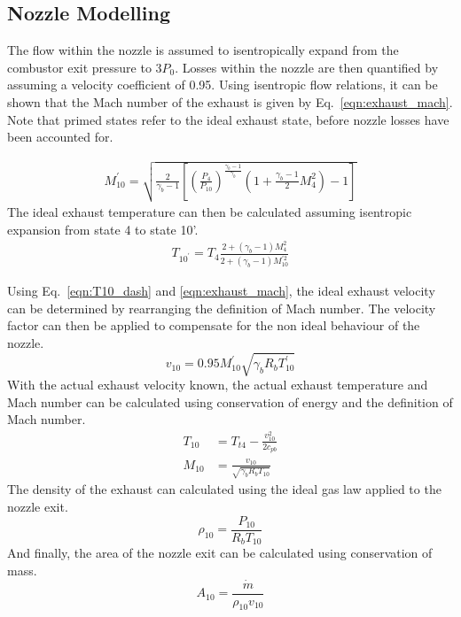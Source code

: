 \documentclass[a4paper]{article}
\begin{document}
\subsection{Nozzle Modelling}\label{subsec:nozzle_modelling}
The flow within the nozzle is assumed to isentropically expand from the combustor exit pressure to \(3P_0\). Losses within the nozzle are then quantified by assuming a velocity coefficient of 0.95. Using isentropic flow relations, it can be shown that the Mach number of the exhaust is given by Eq.~\ref{eqn:exhaust_mach}. Note that primed states refer to the ideal exhaust state, before nozzle losses have been accounted for.

\begin{align}\label{eqn:exhaust_mach}
    M_{10}^\prime = \sqrt{\frac{2}{\gamma_b - 1} \left[ \left(\frac{P_4}{P_{10}} \right)^{\frac{\gamma_b-1}{\gamma_b}}\left( 1 + \frac{\gamma_b - 1}{2}M_4^2 \right) - 1 \right]}
\end{align}
The ideal exhaust temperature can then be calculated assuming isentropic expansion from state 4 to state 10'.
\begin{align}\label{eqn:T10_dash}
    T_{10^\prime} = T_4 \frac{2 + (\gamma_b - 1) M_4^2}{2 + (\gamma_b - 1) M_{10}^{\prime 2}}
\end{align}

Using Eq.~\ref{eqn:T10_dash} and \ref{eqn:exhaust_mach}, the ideal exhaust velocity can be determined by rearranging the definition of Mach number. The velocity factor can then be applied to compensate for the non ideal behaviour of the nozzle.
\begin{equation}\label{eqn:v10_dash}
    v_{10} = 0.95 M_{10}^\prime \sqrt{\gamma_b R_b T_{10}^\prime}
\end{equation}
With the actual exhaust velocity known, the actual exhaust temperature and Mach number can be calculated using conservation of energy and the definition of Mach number.
\begin{align}
    T_{10} &= T_{t4} - \frac{v_{10}^2}{2c_{pb}} \label{eqn:T10} \\
    M_{10} &= \frac{v_{10}}{\sqrt{\gamma_b R_b T_{10}}} \label{eqn:M10}
\end{align}
The density of the exhaust can calculated using the ideal gas law applied to the nozzle exit.
\begin{equation}
    \rho_{10} = \frac{P_{10}}{R_b  T_{10}}
\end{equation}
And finally, the area of the nozzle exit can be calculated using conservation of mass.
\begin{equation}
    A_{10} = \frac{\dot{m}}{\rho_{10}v_{10}}
\end{equation}
\end{document}
